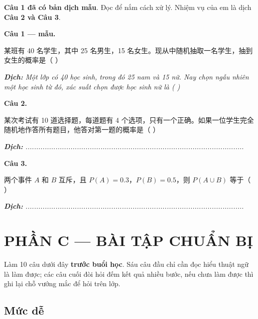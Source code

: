 \documentclass[11pt, a4paper]{article}
\begin{document}
\textbf{Câu 1 đã có bản dịch mẫu}. Đọc để nắm cách xử lý. Nhiệm vụ của em là dịch \textbf{Câu 2 và Câu 3}.

\textbf{Câu 1 — mẫu.}

某班有 40 名学生，其中 25 名男生，15 名女生。现从中随机抽取一名学生，抽到女生的概率是（ ）

\noindent\emph{\textbf{Dịch:} Một lớp có 40 học sinh, trong đó 25 nam và 15 nữ. Nay chọn ngẫu nhiên một học sinh từ đó, xác suất chọn được học sinh nữ là ( )}

\textbf{Câu 2.}

某次考试有 10 道选择题，每道题有 4 个选项，只有一个正确。如果一位学生完全随机地作答所有题目，他答对第一题的概率是（ ）

\noindent\emph{\textbf{Dịch:} ......................................................................................................}

\textbf{Câu 3.}

两个事件 $A$ 和 $B$ 互斥，且 $P(A)=0.3$，$P(B)=0.5$，则 $P(A\cup B)$ 等于（ ）

\noindent\emph{\textbf{Dịch:} ......................................................................................................}

\section{PHẦN C — BÀI TẬP CHUẨN BỊ}

Làm 10 câu dưới đây \textbf{trước buổi học}. Sáu câu đầu chỉ cần đọc hiểu thuật ngữ là làm được; các câu cuối đòi hỏi đếm kết quả nhiều bước, nếu chưa làm được thì ghi lại chỗ vướng mắc để hỏi trên lớp.

\subsection{Mức dễ}
\end{document}

